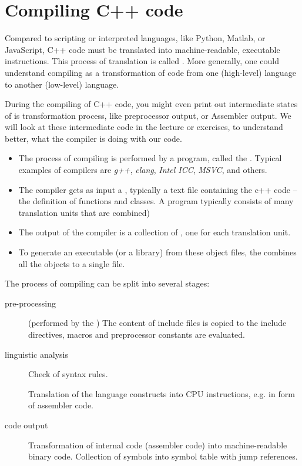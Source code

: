 \section{Compiling C++ code\label{sec:compiling}}
Compared to scripting or interpreted languages, like Python, Matlab, or JavaScript, C++ code must be translated into machine-readable, executable instructions. This process of translation is called . More generally, one could understand compiling as a transformation of code
from one (high-level) language to another (low-level) language.

\begin{rem}
  During the compiling of C++ code, you might even print out intermediate states of is transformation process, like preprocessor output, or
  Assembler output. We will look at these intermediate code in the lecture or exercises, to understand better, what the compiler is doing with
  our code.
\end{rem}

\begin{itemize}
\item The process of compiling is performed by a program, called the . Typical examples of compilers are \emph{g++},
      \emph{clang}, \emph{Intel ICC}, \emph{MSVC}, and others.
\item The compiler gets as input a , typically a text file containing the c++ code -- the definition of functions and classes.
      A program typically consists of many translation units that are combined)
\item The output of the compiler is a collection of , one for each translation unit.
\item To generate an executable (or a library) from these object files, the  combines all the objects to a single file.
\end{itemize}

The process of compiling can be split into several stages:
\begin{description}
  \item[pre-processing] (performed by the ) The content of include files is copied to the include directives, macros and
  preprocessor constants are evaluated.
  \item[linguistic analysis] Check of syntax rules.
  \item[] Translation of the language constructs into CPU instructions, e.g. in form of assembler code.
  \item[code output] Transformation of internal code (assembler code) into machine-readable binary code. Collection of symbols into
  symbol table with jump references.
\end{description}

